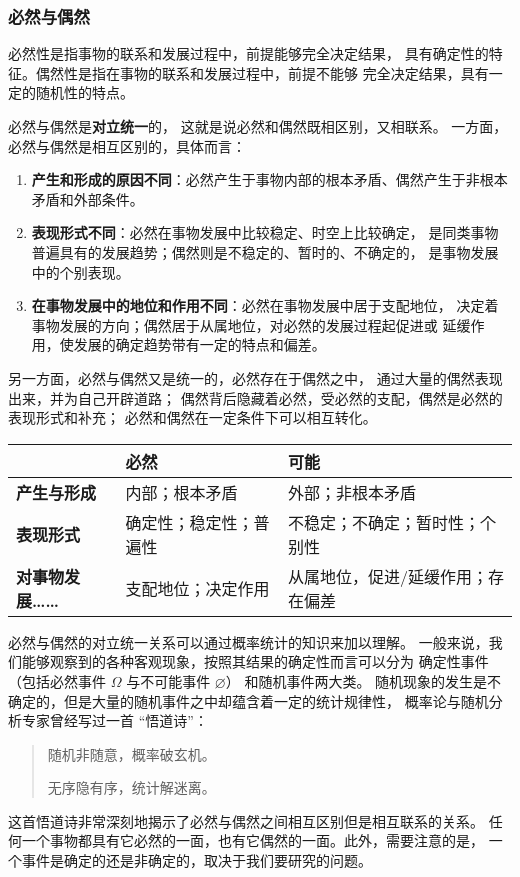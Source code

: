 \documentclass[utf-8, 10pt]{article}
\begin{document}
\subsubsection{必然与偶然}

必然性是指事物的联系和发展过程中，前提能够完全决定结果，
具有确定性的特征。偶然性是指在事物的联系和发展过程中，前提不能够
完全决定结果，具有一定的随机性的特点。

必然与偶然是\textbf{对立统一}的，
这就是说{\kaishu 必然和偶然既相区别，又相联系}。
一方面，必然与偶然是相互区别的，具体而言：
\begin{enumerate}[label={$\left.\arabic*\right)$}, itemsep=0pt]
    \item \textbf{产生和形成的原因不同}：必然产生于事物内部的根本矛盾、偶然产生于非根本
    矛盾和外部条件。
    \item \textbf{表现形式不同}：必然在事物发展中比较稳定、时空上比较确定，
    是同类事物普遍具有的发展趋势；偶然则是不稳定的、暂时的、不确定的，
    是事物发展中的个别表现。
    \item \textbf{在事物发展中的地位和作用不同}：必然在事物发展中居于支配地位，
    决定着事物发展的方向；偶然居于从属地位，对必然的发展过程起促进或
    延缓作用，使发展的确定趋势带有一定的特点和偏差。
\end{enumerate}
另一方面，必然与偶然又是统一的，必然存在于偶然之中，
通过大量的偶然表现出来，并为自己开辟道路；
偶然背后隐藏着必然，受必然的支配，偶然是必然的表现形式和补充；
必然和偶然在一定条件下可以相互转化。

{ %
\label{必然与偶然的区别} %
\begin{longtable}{p{7em}|p{11em}p{16em}}
    \hline
    & \textbf{必然} & \textbf{可能} \\
    \hline
    \endhead
    \hline
    \endfoot

    \textbf{产生与形成} & 内部；根本矛盾 & 外部；非根本矛盾 \\ 
    \textbf{表现形式} & 确定性；稳定性；普遍性 & 不稳定；不确定；暂时性；个别性 \\ 
    \textbf{对事物发展……} & 支配地位；决定作用 & 从属地位，促进/延缓作用；存在偏差 \\
\end{longtable}}


必然与偶然的对立统一关系可以通过概率统计的知识来加以理解。
一般来说，我们能够观察到的各种客观现象，按照其结果的确定性而言可以分为
确定性事件（包括必然事件 $\varOmega$ 与不可能事件 $\varnothing$）
和随机事件两大类。
随机现象的发生是不确定的，但是大量的随机事件之中却蕴含着一定的统计规律性，
概率论与随机分析专家曾经写过一首 “悟道诗”：
\begin{quote}
    \kaishu
    随机非随意，概率破玄机。

    无序隐有序，统计解迷离。
\end{quote}
这首悟道诗非常深刻地揭示了必然与偶然之间相互区别但是相互联系的关系。
任何一个事物都具有它必然的一面，也有它偶然的一面。此外，需要注意的是，
一个事件是确定的还是非确定的，取决于我们要研究的问题。
\end{document}
